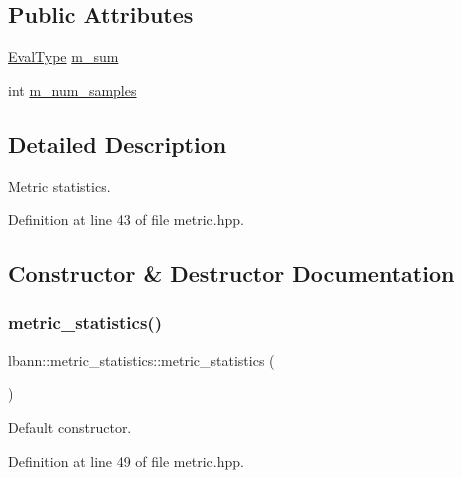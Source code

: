 \subsection*{Public Attributes}
\begin{DoxyCompactItemize}
\item 
\hyperlink{base_8hpp_a3266f5ac18504bbadea983c109566867}{Eval\+Type} \hyperlink{structlbann_1_1metric__statistics_a3481b2bb165e12a52db847f40a70f800}{m\+\_\+sum}
\item 
int \hyperlink{structlbann_1_1metric__statistics_a6633bf91863b7e2327563ac93a9783f7}{m\+\_\+num\+\_\+samples}
\end{DoxyCompactItemize}


\subsection{Detailed Description}
Metric statistics. 

Definition at line 43 of file metric.\+hpp.



\subsection{Constructor \& Destructor Documentation}
\mbox{\label{structlbann_1_1metric__statistics_ab1d7b4cee7135230e0b3c6f56a579879}} 
\subsubsection{\texorpdfstring{metric\+\_\+statistics()}{metric\_statistics()}\hspace{0.1cm}{\footnotesize\ttfamily [1/3]}}
{\footnotesize\ttfamily lbann\+::metric\+\_\+statistics\+::metric\+\_\+statistics (\begin{DoxyParamCaption}{ }\end{DoxyParamCaption})\hspace{0.3cm}{\ttfamily [inline]}}

Default constructor. 

Definition at line 49 of file metric.\+hpp.


